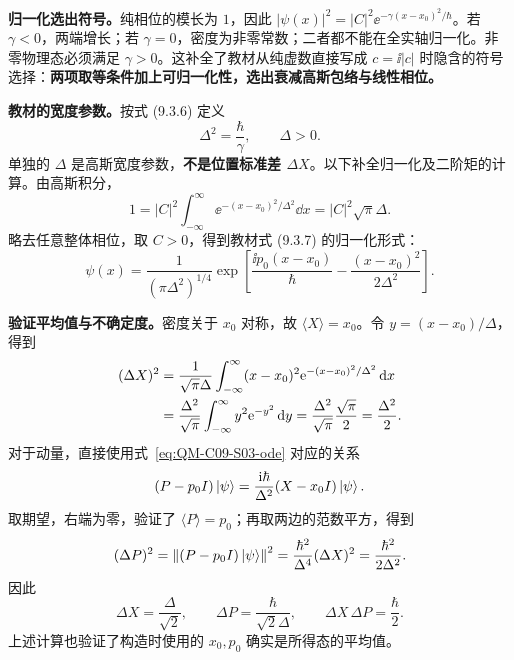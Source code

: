 \textbf{归一化选出符号。}纯相位的模长为 $1$，因此 $|\psi(x)|^2=|C|^2\ee^{-\gamma(x-x_0)^2/\hbar}$。若 $\gamma<0$，两端增长；若 $\gamma=0$，密度为非零常数；二者都不能在全实轴归一化。非零物理态必须满足 $\gamma>0$。这补全了教材从纯虚数直接写成 $c=\ii|c|$ 时隐含的符号选择：\textbf{两项取等条件加上可归一化性，选出衰减高斯包络与线性相位。}

\textbf{教材的宽度参数。}按式 (9.3.6) 定义
\begin{equation}
  \Delta^2=\frac{\hbar}{\gamma},\qquad \Delta>0.
\end{equation}
单独的 $\Delta$ 是高斯宽度参数，\textbf{不是位置标准差 $\Delta X$}。以下补全归一化及二阶矩的计算。由高斯积分，
\begin{equation}
  1=|C|^2\int_{-\infty}^{\infty}
    \ee^{-(x-x_0)^2/\Delta^2}\dd x
   =|C|^2\sqrt\pi\Delta.
\end{equation}
略去任意整体相位，取 $C>0$，得到教材式 (9.3.7) 的归一化形式：
\begin{equation}
  \boxed{\psi(x)=\frac{1}{(\pi\Delta^2)^{1/4}}
    \exp\!\left[\frac{\ii p_0(x-x_0)}{\hbar}
    -\frac{(x-x_0)^2}{2\Delta^2}\right]}.
  \label{eq:QM-C09-S03-normalized}
\end{equation}

\textbf{验证平均值与不确定度。}密度关于 $x_0$ 对称，故 $\langle X\rangle=x_0$。令 $y=(x-x_0)/\Delta$，得到
\begin{align}
  (\Delta X)^2
   &=\frac{1}{\sqrt\pi\Delta}\int_{-\infty}^{\infty}
       (x-x_0)^2\mathrm{e}^{-(x-x_0)^2/\Delta^2}\mathop{}\!\mathrm{d} x\notag\\
   &=\frac{\Delta^2}{\sqrt\pi}\int_{-\infty}^{\infty}y^2\mathrm{e}^{-y^2}\mathop{}\!\mathrm{d} y
    =\frac{\Delta^2}{\sqrt\pi}\frac{\sqrt\pi}{2}
    =\frac{\Delta^2}{2}.
\end{align}
对于动量，直接使用式~\eqref{eq:QM-C09-S03-ode} 对应的关系
\begin{equation}
  (P-p_0I)\left|\psi\right\rangle
   =\frac{\mathrm{i}\hbar}{\Delta^2}(X-x_0I)\left|\psi\right\rangle.
\end{equation}
取期望，右端为零，验证了 $\langle P\rangle=p_0$；再取两边的范数平方，得到
\begin{equation}
  (\Delta P)^2=\left\lVert (P-p_0I)\left|\psi\right\rangle \right\rVert^2
   =\frac{\hbar^2}{\Delta^4}(\Delta X)^2
   =\frac{\hbar^2}{2\Delta^2}.
\end{equation}
因此
\begin{equation}
  \boxed{\Delta X=\frac{\Delta}{\sqrt2},\qquad
    \Delta P=\frac{\hbar}{\sqrt2\Delta},\qquad
    \Delta X\,\Delta P=\frac{\hbar}{2}}.
  \label{eq:QM-C09-S03-uncertainties}
\end{equation}
上述计算也验证了构造时使用的 $x_0,p_0$ 确实是所得态的平均值。

